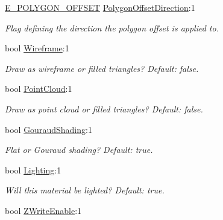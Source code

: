 \begin{DoxyCompactItemize}
\hyperlink{namespaceirr_1_1video_a812b866b910c946f5bc813f8eab31144}{E\+\_\+\+P\+O\+L\+Y\+G\+O\+N\+\_\+\+O\+F\+F\+S\+ET} \hyperlink{classirr_1_1video_1_1SMaterial_ab3da2285d0e74fc99eafdd8944ea4eb8}{Polygon\+Offset\+Direction}\+:1
\begin{DoxyCompactList}\small\item\em Flag defining the direction the polygon offset is applied to. \end{DoxyCompactList}\item 
bool \hyperlink{classirr_1_1video_1_1SMaterial_a6fb428e6e27d0e143cc7da5ea19f8dcc}{Wireframe}\+:1
\begin{DoxyCompactList}\small\item\em Draw as wireframe or filled triangles? Default\+: false. \end{DoxyCompactList}\item 
\mbox{\label{classirr_1_1video_1_1SMaterial_a457d243ff8c1cd1777c70349fa55515c}} 
bool \hyperlink{classirr_1_1video_1_1SMaterial_a457d243ff8c1cd1777c70349fa55515c}{Point\+Cloud}\+:1
\begin{DoxyCompactList}\small\item\em Draw as point cloud or filled triangles? Default\+: false. \end{DoxyCompactList}\item 
\mbox{\label{classirr_1_1video_1_1SMaterial_abf4a3e138d75670ec772fbadb8965e43}} 
bool \hyperlink{classirr_1_1video_1_1SMaterial_abf4a3e138d75670ec772fbadb8965e43}{Gouraud\+Shading}\+:1
\begin{DoxyCompactList}\small\item\em Flat or Gouraud shading? Default\+: true. \end{DoxyCompactList}\item 
\mbox{\label{classirr_1_1video_1_1SMaterial_afde014546a3d1da0f91ee06494d48e2b}} 
bool \hyperlink{classirr_1_1video_1_1SMaterial_afde014546a3d1da0f91ee06494d48e2b}{Lighting}\+:1
\begin{DoxyCompactList}\small\item\em Will this material be lighted? Default\+: true. \end{DoxyCompactList}\item 
bool \hyperlink{classirr_1_1video_1_1SMaterial_a0e6b40e87162a74f2c730af597e20721}{Z\+Write\+Enable}\+:1

\end{DoxyCompactItemize}
